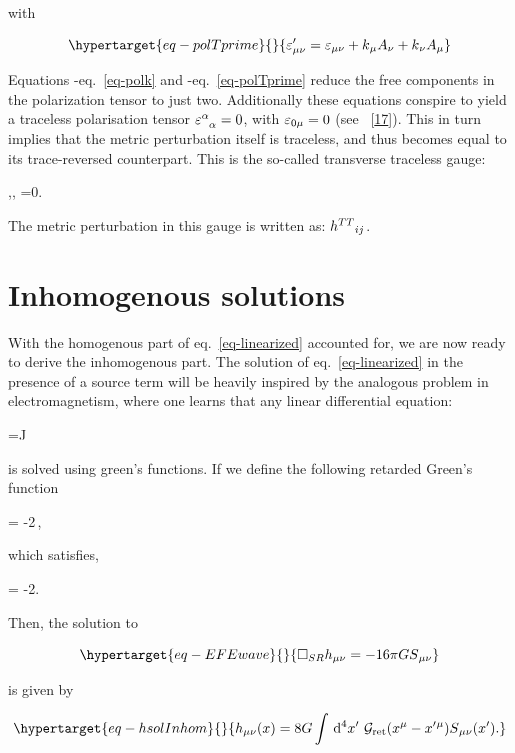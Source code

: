 \documentclass[
  11pt,
  a4paper,
  DIV=11,
  numbers=noendperiod,
  twoside]{scrreprt}
\let\[\relax \let\]\relax %
\DeclareRobustCommand{\[}{\begin{equation}}
\DeclareRobustCommand{\]}{\end{equation}}
\begin{document}
with

\begin{equation}\protect\hypertarget{eq-polTprime}{}{
\polTensor'_{\mu\nu} = \polco + \co{k}\co[\nu]{A} + \co[\nu]{k}\co{A}
}\label{eq-polTprime}\end{equation}

Equations -eq.~\ref{eq-polk} and -eq.~\ref{eq-polTprime} reduce the free
components in the polarization tensor to just two. Additionally these
equations conspire to yield a traceless polarisation tensor
\(\trpol=0\), with \(\polco[0\mu]=0\) (see
~{[}\protect\hyperlink{ref-Carroll:2019}{17}{]}). This in turn implies
that the metric perturbation itself is traceless, and thus becomes equal
to its trace-reversed counterpart. This is the so-called transverse
traceless gauge:

\[
,\quad {}, \quad \ipdv[^]{\weakmet}{\nu}=0.
\]

The metric perturbation in this gauge is written as: \(\weakTTmet\).

\hypertarget{inhomogenous-solutions}{%
\section{Inhomogenous solutions}\label{inhomogenous-solutions}}

With the homogenous part of eq.~\ref{eq-linearized} accounted for, we
are now ready to derive the inhomogenous part. The solution of
eq.~\ref{eq-linearized} in the presence of a source term will be heavily
inspired by the analogous problem in electromagnetism, where one learns
that any linear differential equation:

\[\phi=J\]

is solved using green's functions. If we define the following retarded
Green's function

\[
     = -2\pi\,,
\]

which satisfies,

\[
    \SRDA{} = -2\pi {}.
\]

Then, the solution to

\begin{equation}\protect\hypertarget{eq-EFEwave}{}{
 \SRDA \weakmet =  -16 \pi \grav \srcco
}\label{eq-EFEwave}\end{equation}

is given by

\begin{equation}\protect\hypertarget{eq-hsolInhom}{}{
    \weakmet(x) = 8G\int\dd[4]{x'}\,\greens{\ct{x}-\ct{x'}}\srcco(x').
}\label{eq-hsolInhom}\end{equation}
\end{document}
